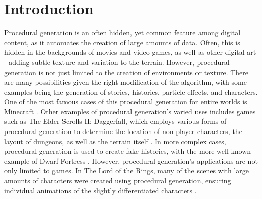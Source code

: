 \documentclass[10pt]{report}
\begin{document}
	\clearpage
	
	\tableofcontents
	
	\clearpage
	
	\let\clearpage\relax
	\chapter{Introduction}
		
		Procedural generation is an often hidden, yet common feature among digital content, as it automates the creation of large amounts of data. Often, this is hidden in the backgrounds of movies and video games, as well as other digital art - adding subtle texture and variation to the terrain. However, procedural generation is not just limited to the creation of environments or texture. There are many possibilities given the right modification of the algorithm, with some examples being the generation of stories, histories, particle effects, and characters. One of the most famous cases of this procedural generation for entire worlds is Minecraft \cite{minecraft-gen}. Other examples of procedural generation's varied uses includes games such as The Elder Scrolls II: Daggerfall, which employs various forms of procedural generation to determine the location of non-player characters, the layout of dungeons, as well as the terrain itself \cite{daggerfall}. In more complex cases, procedural generation is used to create fake histories, with the more well-known example of Dwarf Fortress \cite{df-dev}. However, procedural generation's applications are not only limited to games. In The Lord of the Rings, many of the scenes with large amounts of characters were created using procedural generation, ensuring individual animations of the slightly differentiated characters \cite{massive}.
		
\end{document}
